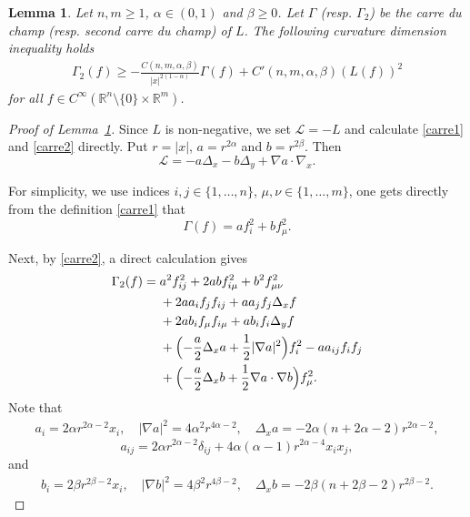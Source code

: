 \documentclass[10pt,a4paper]{amsart}
\newtheorem{lemma}{Lemma}
\begin{document}
\begin{lemma}\label{le_Ric_Grushin}
Let $n,m\ge 1$, $\alpha \in (0,1)$ and $\beta \ge 0$. Let $\Gamma$ (resp. $\Gamma_2$) be the \textit{carre du champ} (resp. second \textit{carre du champ}) of $L$. The following curvature dimension inequality holds
\begin{align*}
\Gamma_2(f) \ge - \frac{C(n,m,\alpha,\beta)}{|x|^{2(1-\alpha)}} \Gamma(f) + C'(n,m,\alpha,\beta) \left(L(f) \right)^2
\end{align*}
for all $f\in C^\infty( \mathbb{R}^{n}\setminus\{0\} \times \mathbb{R}^m)$.
\end{lemma}

\begin{proof}[Proof of Lemma~\ref{le_Ric_Grushin}]
Since $L$ is non-negative, we set $\mathcal{L} = -L$ and calculate \eqref{carre1} and \eqref{carre2} directly. Put $r=|x|$, $a = r^{2\alpha}$ and $b=r^{2\beta}$. Then
\begin{equation*}
\mathcal L = -a\Delta_x - b\Delta_y+\nabla a\cdot \nabla_x.
\end{equation*}

For simplicity, we use indices $i,j\in\{1,\dots,n\}$, $\mu,\nu\in\{1,\dots,m\}$, one gets directly from the definition \eqref{carre1} that
\begin{equation}\label{eq_gamma1}
    \Gamma(f)=a f_i^2+b f_\mu^2.
\end{equation}

Next, by \eqref{carre2}, a direct calculation gives
\begin{align}\label{eq_gamma2}
\Gamma_2(f)
={}&a^2 f_{ij}^2+2ab f_{i\mu}^2+b^2 f_{\mu\nu}^2\\ \nonumber
&+2a a_i f_j f_{ij} + a a_j f_j \Delta_x f\\ \nonumber
&+2a b_i f_\mu f_{i\mu}+ a b_i f_i \Delta_y f\\ \nonumber
&+\Bigl(-\frac a2 \Delta_x a+\frac12|\nabla a|^2\Bigr)f_i^2
-a a_{ij}f_i f_j\\ \nonumber
&+\Bigl(-\frac a2 \Delta_x b+\frac12\nabla a\cdot \nabla b\Bigr)f_\mu^2.
\end{align}
Note that
\begin{align*}
    a_i=2\alpha r^{2\alpha-2}x_i,\quad
|\nabla a|^2 = 4\alpha^2 r^{4\alpha-2},
\quad
\Delta_x a = -2\alpha(n+2\alpha-2)r^{2\alpha-2},
\end{align*}
\begin{equation*}
    a_{ij} = 2\alpha r^{2\alpha-2}\delta_{ij}
 + 4\alpha(\alpha-1)r^{2\alpha-4}x_i x_j,
\end{equation*}
and 
\begin{align*}
    b_i = 2\beta r^{2\beta-2}x_i,\quad
|\nabla b|^2 = 4\beta^2 r^{4\beta-2},
\quad
\Delta_x b = -2\beta(n+2\beta-2)r^{2\beta-2}.
\end{align*}



\end{proof}
\end{document}
